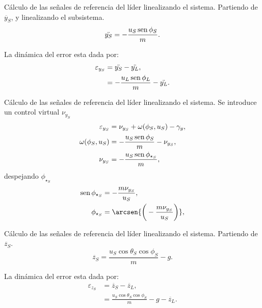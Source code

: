 \documentclass[hyperref={pdfpagelabels=false}]{beamer}
\begin{document}
\begin{frame}{Cálculo de las señales de referencia del l\'ider linealizando el sistema.} 
	Partiendo de $\ddot{y_S}$, y linealizando el subsistema.
	\begin{equation}
		\ddot{y_S} = -\frac{u_S \operatorname{sen}{\phi_S}}{m}.
	\end{equation}
	
	La dinámica del error esta dada por: 
	\begin{equation}
		\begin{split}
			\varepsilon_{y_S} &= \ddot{y_S} - \ddot{y_L},\\
			&=-\frac{u_L \operatorname{sen}{\phi_L}}{m} - \ddot{y_L}.
		\end{split}	
	\end{equation}
\end{frame}


\begin{frame}{Cálculo de las señales de referencia del l\'ider linealizando el sistema.} 
	Se introduce un control virtual $\nu_{y_S}$
	\begin{equation}
		\begin{split}
			\varepsilon_{y_S} &= \nu_{y_S} + \omega(\phi_S,u_S)- \gamma_y,\\
			\omega(\phi_S,u_S) &= -\frac{u_S \operatorname{sen}{\phi_S}}{m} - \nu_{y_S},\\
			\nu_{y_S} &= -\frac{u_S \operatorname{sen}{\phi_{\star_S}}}{m},
		\end{split}
	\end{equation}
	despejando $\phi_{\star_S}$
	\begin{equation}
		\begin{split}
			\sen{\phi_{\star_S}} &= -\frac{m \nu_{y_S}}{u_S},\\
			\phi_{\star_S} &= \arcsen{\bigg(-\frac{m \nu_{y_S}}{u_S}\bigg)},\\
		\end{split}
	\end{equation}
\end{frame}

\begin{frame}{Cálculo de las señales de referencia del l\'ider linealizando el sistema.} 
	Partiendo de $\ddot{z_S}$.
	\begin{equation}
		\ddot{z_S} = \frac{u_S \cos{\theta_S}\cos{\phi_S}}{m}-g.
	\end{equation}
	
	La dinámica del error esta dada por: 
	\begin{equation}
		\begin{split}
			\varepsilon_{z_S} &= \ddot{z_S} - \ddot{z_L},\\
			&=  \frac{u_S \cos{\theta_S}\cos{\phi_S}}{m}-g - \ddot{z_L}.
		\end{split}	
	\end{equation}
\end{frame}
\end{document}
